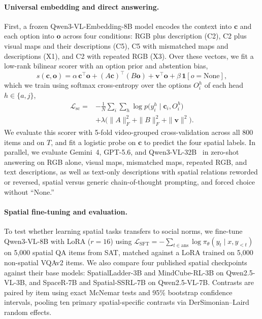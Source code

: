 \paragraph{Universal embedding and direct answering.}
First, a frozen Qwen3-VL-Embedding-8B model encodes the context into $\mathbf c$ and each option into $\mathbf o$ across four conditions: RGB plus description (C2), C2 plus visual maps and their descriptions (C5), C5 with mismatched maps and descriptions (X1), and C2 with repeated RGB (X3). Over these vectors, we fit a low-rank bilinear scorer with an option prior and abstention bias,
\begin{equation}
s(\mathbf c,\mathbf o)=\alpha\,\mathbf c^{\top}\mathbf o+(A\mathbf c)^{\top}(B\mathbf o)+\mathbf v^{\top}\mathbf o+\beta\,\mathbf 1[o=\text{None}],
\end{equation}
which we train using softmax cross-entropy over the options $O^{h}_i$ of each head $h\in\{a,j\}$,
\begin{equation}
\begin{split}
\mathcal L_{\mathrm{sc}}={}&-\tfrac1N\textstyle\sum_{i}\sum_{h}\log p\big(y^{h}_i\mid\mathbf c_i,O^{h}_i\big)\\
&+\lambda\big(\|A\|_F^2+\|B\|_F^2+\|\mathbf v\|^2\big).
\end{split}
\end{equation}
We evaluate this scorer with 5-fold video-grouped cross-validation across all 800 items and on $T$, and fit a logistic probe on $\mathbf c$ to predict the four spatial labels. In parallel, we evaluate Gemini~4, GPT-5.6, and Qwen3-VL-32B~\citep{bai2025qwen3vl} in zero-shot answering on RGB alone, visual maps, mismatched maps, repeated RGB, and text descriptions, as well as text-only descriptions with spatial relations reworded or reversed, spatial versus generic chain-of-thought prompting, and forced choice without ``None.''

\paragraph{Spatial fine-tuning and evaluation.}
To test whether learning spatial tasks transfers to social norms, we fine-tune Qwen3-VL-8B with LoRA ($r{=}16$) using $\mathcal L_{\mathrm{SFT}}=-\sum_{t\in\mathrm{ans}}\log\pi_\theta(y_t\mid x,y_{<t})$ on 5,000 spatial QA items from SAT, matched against a LoRA trained on 5,000 non-spatial VQAv2 items. We also compare four published spatial checkpoints against their base models: SpatialLadder-3B and MindCube-RL-3B on Qwen2.5-VL-3B, and SpaceR-7B and Spatial-SSRL-7B on Qwen2.5-VL-7B. Contrasts are paired by item using exact McNemar tests and 95\% bootstrap confidence intervals, pooling ten primary spatial-specific contrasts via DerSimonian--Laird random effects.

